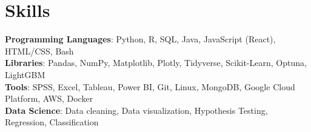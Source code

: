 \section{Skills}
 \begin{itemize}[leftmargin=0.15in, label={}]
    \small{\item{
     \textbf{Programming Languages}{: Python, R, SQL, Java, JavaScript (React), HTML/CSS, Bash} \\
     \textbf{Libraries}{: Pandas, NumPy, Matplotlib, Plotly, Tidyverse, Scikit-Learn, Optuna, LightGBM}\\
     \textbf{Tools}{: SPSS, Excel, Tableau, Power BI, Git, Linux, MongoDB, Google Cloud Platform, AWS, Docker}\\
     \textbf{Data Science}{: Data cleaning, Data visualization, Hypothesis Testing, Regression, Classification}\\
    }}
 \end{itemize}